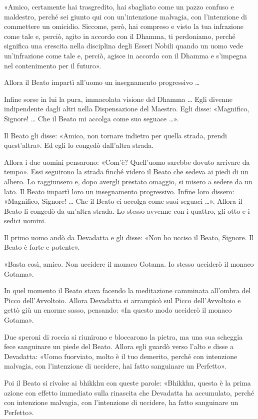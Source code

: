 «Amico, certamente hai trasgredito, hai sbagliato come un pazzo confuso
e maldestro, perché sei giunto qui con un’intenzione malvagia, con
l’intenzione di commettere un omicidio. Siccome, però, hai compreso e
visto la tua infrazione come tale e, perciò, agito in accordo con il
Dhamma, ti perdoniamo, perché significa una crescita nella disciplina
degli Esseri Nobili quando un uomo vede un’infrazione come tale e,
perciò, agisce in accordo con il Dhamma e s’impegna nel contenimento per
il futuro».


Allora il Beato impartì all’uomo un insegnamento progressivo …


Infine sorse in lui la pura, immacolata visione del Dhamma … Egli
divenne indipendente dagli altri nella Dispensazione del Maestro. Egli
disse: «Magnifico, Signore! … Che il Beato mi accolga come suo seguace
…».


Il Beato gli disse: «Amico, non tornare indietro per quella strada,
prendi quest’altra». Ed egli lo congedò dall’altra strada.


Allora i due uomini pensarono: «Com’è? Quell’uomo sarebbe dovuto
arrivare da tempo». Essi seguirono la strada finché videro il Beato che
sedeva ai piedi di un albero. Lo raggiunsero e, dopo avergli prestato
omaggio, si misero a sedere da un lato. Il Beato impartì loro un
insegnamento progressivo. Infine loro dissero: «Magnifico, Signore! …
Che il Beato ci accolga come suoi seguaci …». Allora il Beato li congedò
da un’altra strada. Lo stesso avvenne con i quattro, gli otto e i sedici
uomini.


Il primo uomo andò da Devadatta e gli disse: «Non ho ucciso il Beato,
Signore. Il Beato è forte e potente».


«Basta così, amico. Non uccidere il monaco Gotama. Io stesso ucciderò il
monaco Gotama».


In quel momento il Beato stava facendo la meditazione camminata
all’ombra del Picco dell’Avvoltoio. Allora Devadatta si arrampicò sul
Picco dell’Avvoltoio e gettò giù un enorme sasso, pensando: «In questo
modo ucciderò il monaco Gotama».


Due speroni di roccia si riunirono e bloccarono la pietra, ma una sua
scheggia fece sanguinare un piede del Beato. Allora egli guardò verso
l’alto e disse a Devadatta: «Uomo fuorviato, molto è il tuo demerito,
perché con intenzione malvagia, con l’intenzione di uccidere, hai fatto
sanguinare un Perfetto».


Poi il Beato si rivolse ai bhikkhu con queste parole: «Bhikkhu, questa è
la prima azione con effetto immediato sulla rinascita che Devadatta ha
accumulato, perché con intenzione malvagia, con l’intenzione di
uccidere, ha fatto sanguinare un Perfetto».


